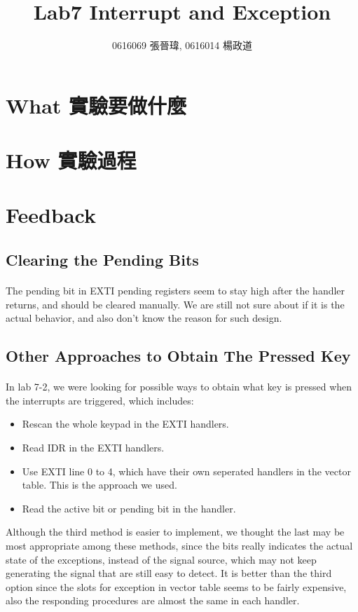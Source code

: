 \title{Lab7 Interrupt and Exception}
\author{0616069 張晉瑋, 0616014 楊政道}
\maketitle
\thispagestyle{fancy}
\section{What 實驗要做什麼}
\paragraph{}
\section{How 實驗過程}
\paragraph{}
\section{Feedback}
\subsection{Clearing the Pending Bits}
\paragraph{}
The pending bit in EXTI pending registers seem to stay high after the handler returns, and should be cleared manually.
We are still not sure about if it is the actual behavior, and also don't know the reason for such design.
\subsection{Other Approaches to Obtain The Pressed Key}
\paragraph{}
In lab 7-2, we were looking for possible ways to obtain what key is pressed when the interrupts are triggered, which includes:
\begin{itemize}
\item Rescan the whole keypad in the EXTI handlers.
\item Read IDR in the EXTI handlers.
\item Use EXTI line 0 to 4, which have their own seperated handlers in the vector table. This is the approach we used.
\item Read the active bit or pending bit in the handler.
\end{itemize}
Although the third method is easier to implement,
we thought the last may be most appropriate among these methods,
since the bits really indicates the actual state of the exceptions, 
instead of the signal source, which may not keep generating the signal that are still easy to detect.
It is better than the third option since the slots for exception in vector table seems to be fairly expensive,
also the responding procedures are almost the same in each handler.
